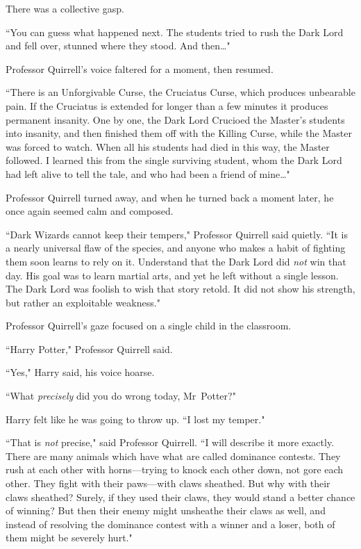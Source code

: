There was a collective gasp.

``You can guess what happened next. The students tried to rush the Dark Lord and fell over, stunned where they stood. And then{\ldots}"

Professor Quirrell's voice faltered for a moment, then resumed.

``There is an Unforgivable Curse, the Cruciatus Curse, which produces unbearable pain. If the Cruciatus is extended for longer than a few minutes it produces permanent insanity. One by one, the Dark Lord Crucioed the Master's students into insanity, and then finished them off with the Killing Curse, while the Master was forced to watch. When all his students had died in this way, the Master followed. I learned this from the single surviving student, whom the Dark Lord had left alive to tell the tale, and who had been a friend of mine{\ldots}"

Professor Quirrell turned away, and when he turned back a moment later, he once again seemed calm and composed.

``Dark Wizards cannot keep their tempers," Professor Quirrell said quietly. ``It is a nearly universal flaw of the species, and anyone who makes a habit of fighting them soon learns to rely on it. Understand that the Dark Lord did \emph{not} win that day. His goal was to learn martial arts, and yet he left without a single lesson. The Dark Lord was foolish to wish that story retold. It did not show his strength, but rather an exploitable weakness."

Professor Quirrell's gaze focused on a single child in the classroom.

``Harry Potter," Professor Quirrell said.

``Yes," Harry said, his voice hoarse.

``What \emph{precisely} did you do wrong today, Mr~Potter?"

Harry felt like he was going to throw up. ``I lost my temper."

``That is \emph{not} precise," said Professor Quirrell. ``I will describe it more exactly. There are many animals which have what are called dominance contests. They rush at each other with horns—trying to knock each other down, not gore each other. They fight with their paws—with claws sheathed. But why with their claws sheathed? Surely, if they used their claws, they would stand a better chance of winning? But then their enemy might unsheathe their claws as well, and instead of resolving the dominance contest with a winner and a loser, both of them might be severely hurt."

